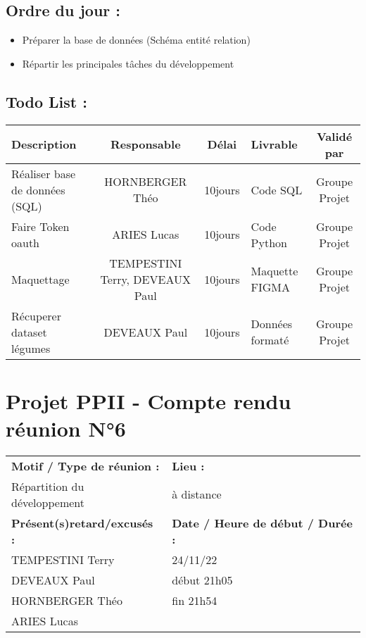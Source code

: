 \documentclass[12pt,titlepage]{report}
\begin{document}
\subsection*{Ordre du jour :}
\begin{itemize}
    \item{Préparer la base de données (Schéma entité relation)}
    \item{Répartir les principales tâches du développement}
\end{itemize}

\subsection*{Todo List :}
\begin{tabular}{|p{3.5cm}|c|c|p{4.5cm}|c|}
    \hline 
    Description & Responsable & Délai & Livrable & Validé par 
    \\ \hline
    Réaliser base de données (SQL) & HORNBERGER Théo & 10jours & Code SQL & Groupe Projet \\ \hline
    Faire Token oauth & ARIES Lucas & 10jours & Code Python & Groupe Projet \\ \hline
    Maquettage & TEMPESTINI Terry, DEVEAUX Paul & 10jours & Maquette FIGMA & Groupe Projet\\ \hline
    Récuperer dataset légumes & DEVEAUX Paul  & 10jours & Données formaté & Groupe Projet\\ \hline
\end{tabular}
\newpage

\section*{Projet PPII - Compte rendu réunion N°6}
\begin{tabular}{|p{7cm}|p{6cm}|}
    \hline
    \textbf{Motif / Type de réunion :}
    & \textbf{Lieu :}
    \\
    Répartition du développement 
    & 
    à distance
    \\ \hline
    \textbf{Présent(s)retard/excusés :}
    &
    \textbf{Date / Heure de début / Durée :}
    \\ 
    TEMPESTINI Terry &  24/11/22\\  
    DEVEAUX Paul & début 21h05\\
    HORNBERGER Théo & fin 21h54\\
    ARIES Lucas & 
    \\ \hline
\end{tabular}
\end{document}
